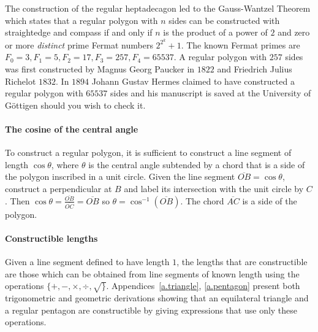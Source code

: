 \documentclass[11pt,a4paper]{article}
\newcommand*{\disfrac}[2]{\displaystyle\frac{#1}{#2}}
\begin{document}
The construction of the regular heptadecagon led to the Gauss-Wantzel Theorem which states that a regular polygon with $n$ sides can be constructed with straightedge and compass if and only if $n$ is the product of a power of $2$ and zero or more \emph{distinct} prime Fermat numbers $2^{2^k}+1$. The known Fermat primes are $F_0=3, F_1=5, F_2=17, F_3=257, F_4=65537$. A regular polygon with $257$ sides was first constructed by Magnus Georg Paucker in $1822$ and Friedrich Julius Richelot $1832$. In $1894$ Johann Gustav Hermes claimed to have constructed a regular polygon  with $65537$ sides and his manuscript is saved at the University of G\"{o}ttigen should you wish to check it.

\paragraph{The cosine of the central angle}
To construct a regular polygon, it is sufficient to construct a line segment of length $\cos \theta$, where $\theta$ is the central angle subtended by a chord that is a side of the polygon inscribed in a unit circle. Given the line segment $\overline{OB}=\cos\theta$, construct a perpendicular at $B$ and label its intersection with the unit circle by $C$. Then $\cos \theta=\disfrac{\overline{OB}}{\overline{OC}}=\overline{OB}$ so $\theta = \cos^{-1} (\overline{OB})$. The chord $\overline{AC}$ is a side of the polygon.
\begin{center}
\end{center}

\paragraph{Constructible lengths} Given a line segment defined to have length $1$, the lengths that are constructible are those which can be obtained from line segments of known length using the operations $\{+,-,\times,\div,\surd\}$.
Appendices~\ref{a.triangle}, \ref{a.pentagon} present both trigonometric and geometric derivations showing that an equilateral triangle and a regular pentagon are constructible by giving expressions  that use only these operations. 
\end{document}
